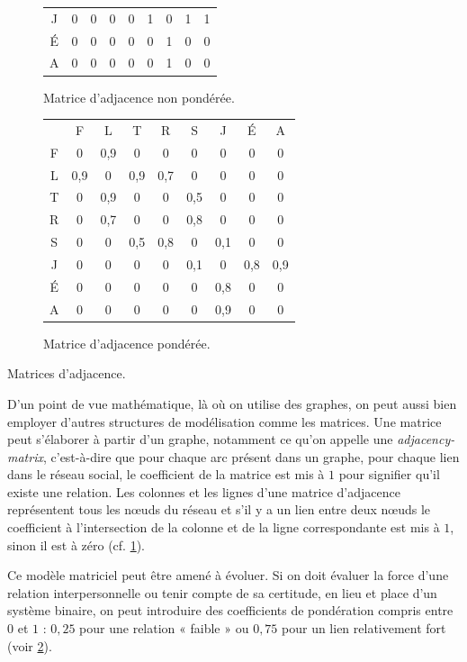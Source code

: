 \begin{marginfigure}
\begin{subfigure}{\linewidth}
\begin{tabular}{@{}c@{~~~~~~}c@{~~~~~~}c@{~~~~~~}c@{~~~~~~}c@{~~~~~~}c@{~~~~~~}c@{~~~~~~}c@{~~~~~~}c@{}}
J & 0 & 0 & 0 & 0 & 1 & 0 & 1 & 1 \\
É & 0 & 0 & 0 & 0 & 0 & 1 & 0 & 0 \\
A & 0 & 0 & 0 & 0 & 0 & 1 & 0 & 0 
\end{tabular}
\caption{\label{fig:II.2b}Matrice d’adjacence non pondérée.}
\end{subfigure}
\begin{subfigure}{\linewidth}
\centering
\vspace{4pt}
\scriptsize
\begin{tabular}{@{}c@{~~~~}c@{~~~~}c@{~~~~}c@{~~~~}c@{~~~~}c@{~~~~}c@{~~~~}c@{~~~~}c@{}}
	& F & L & T & R & S & J & É & A \\
F & 0 & 0,9 & 0 & 0 & 0 & 0 & 0 & 0 \\
L & 0,9 & 0 & 0,9 & 0,7 & 0 & 0 & 0 & 0 \\
T & 0 & 0,9 & 0 & 0 & 0,5 & 0 & 0 & 0 \\
R & 0 & 0,7 & 0 & 0 & 0,8 & 0 & 0 & 0 \\
S & 0 & 0 & 0,5 & 0,8 & 0 & 0,1 & 0 & 0 \\
J & 0 & 0 & 0 & 0 & 0,1 & 0 & 0,8 & 0,9 \\
É & 0 & 0 & 0 & 0 & 0 & 0,8 & 0 & 0 \\
A & 0 & 0 & 0 & 0 & 0 & 0,9 & 0 & 0 
\end{tabular}
\caption{\label{fig:II.2c}Matrice d’adjacence pondérée.}
\end{subfigure}
\caption{\label{fig:II.2}Matrices d’adjacence.}
\end{marginfigure}

D'un point de vue mathématique, là où on utilise des graphes, on peut aussi bien employer d'autres structures de modélisation comme les matrices. Une matrice peut s'élaborer à partir d'un graphe, notamment ce qu'on appelle une \emph{\gls{adjacency-matrix}}, c'est-­à-­dire que pour chaque arc présent dans un graphe, pour chaque lien dans le réseau social, le coefficient de la matrice est mis à $1$ pour signifier qu'il existe une relation. Les colonnes et les lignes d'une matrice d'adjacence représentent tous les nœuds du réseau et s'il y a un lien entre deux nœuds le coefficient à l'intersection de la colonne et de la ligne correspondante est mis à $1$, sinon il est à zéro (cf. \cref{fig:II.2b}). 

Ce modèle matriciel peut être amené à évoluer. Si on doit évaluer la force d'une relation interpersonnelle ou tenir compte de sa certitude, en lieu et place d'un système binaire, on peut introduire des coefficients de pondération compris entre $0$ et $1$ : $0,$$25$ pour une relation « faible » ou $0,$$75$ pour un lien relativement fort (voir \cref{fig:II.2c}).

